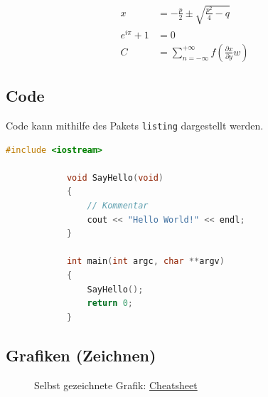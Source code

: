        \begin{align}
            x &= -\frac{p}{2}\pm\sqrt{\frac{p^2}{4}-q}\label{Gl:1}\\
            e^{i \pi} + 1 &= 0\label{Gl:2}\\
            C &= \sum_{n=-\infty}^{+\infty} f(\frac{\partial x}{\partial y}w)
        \end{align}


    \clearpage
    \subsection{Code}

    Code kann mithilfe des Pakets \verb|listing| dargestellt werden.
        \begin{lstlisting}[language=C++,name={C++ Beispiel},label={sc:bsp:1}]
            #include <iostream>

            void SayHello(void)
            {
                // Kommentar
                cout << "Hello World!" << endl;
            }

            int main(int argc, char **argv)
            {
                SayHello();
                return 0;
            }
            \end{lstlisting}

    \subsection{Grafiken (Zeichnen)}
    \begin{figure}[!htbp]
        \centering
        \caption{Selbst gezeichnete Grafik: \hyperref{https://greysonwesley.com/files/TikZCheatsheet.pdf}{}{}{Cheatsheet}}\label{fig:my_graph}
    \end{figure}
    
